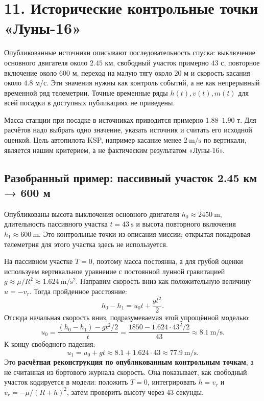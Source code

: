 \documentclass[11pt,a4paper]{article}
\begin{document}
\section{11. Исторические контрольные точки «Луны-16»}
Опубликованные источники описывают последовательность спуска: выключение основного двигателя около $2.45$ км, свободный участок примерно $43$ с, повторное включение около $600$ м, переход на малую тягу около $20$ м и скорость касания около $4.8$ м/с. Эти значения нужны как контроль событий, а не как непрерывный временной ряд телеметрии. Точные временные ряды $h(t),v(t),m(t)$ для всей посадки в доступных публикациях не приведены.

Масса станции при посадке в источниках приводится примерно $1.88$--$1.90$ т. Для расчётов надо выбрать одно значение, указать источник и считать его исходной оценкой. Цель автопилота KSP, например касание менее $2\ \mathrm{m/s}$ по вертикали, является нашим критерием, а не фактическим результатом «Луны-16».

\subsection*{Разобранный пример: пассивный участок 2.45 км → 600 м}
Опубликованы высота выключения основного двигателя $h_0\approx2450\ \mathrm{m}$, длительность пассивного участка $t=43\ \mathrm{s}$ и высота повторного включения $h_1\approx600\ \mathrm{m}$. Это контрольные точки из описания миссии; открытая покадровая телеметрия для этого участка здесь не используется.

На пассивном участке $T=0$, поэтому масса постоянна, а для грубой оценки используем вертикальное уравнение с постоянной лунной гравитацией $g\approx\mu/R^2\approx1.624\ \mathrm{m/s^2}$. Направим скорость вниз как положительную величину $u=-v_r$. Тогда пройденное расстояние:
\[
h_0-h_1=u_0t+\frac{gt^2}{2}.
\]
Отсюда начальная скорость вниз, подразумеваемая этой упрощённой моделью:
\[
u_0=\frac{(h_0-h_1)-gt^2/2}{t}
=\frac{1850-1.624\cdot43^2/2}{43}
\approx8.1\ \mathrm{m/s}.
\]
К концу свободного падения:
\[
u_1=u_0+gt\approx8.1+1.624\cdot43\approx77.9\ \mathrm{m/s}.
\]
Это \textbf{расчётная реконструкция по опубликованным контрольным точкам}, а не считанная из бортового журнала скорость. Она показывает, как свободный участок кодируется в модели: положить $T=0$, интегрировать $\dot h=v_r$ и $\dot v_r=-\mu/(R+h)^2$, затем проверить высоту через 43 секунды.
\end{document}

